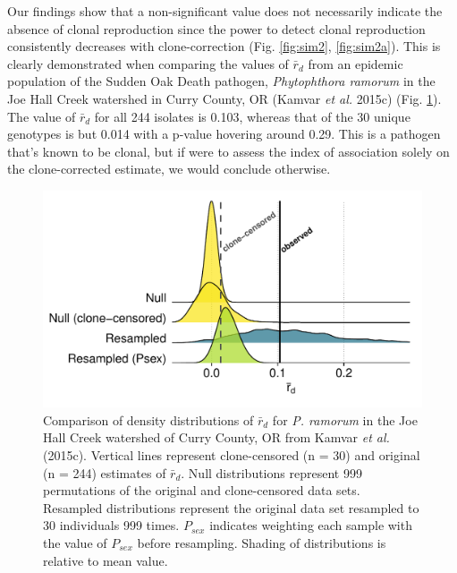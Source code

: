 \documentclass[]{article}
\theoremstyle{definition}
\theoremstyle{definition}
\theoremstyle{definition}
\theoremstyle{remark}
\begin{document}
Our findings show that a non-significant value does not necessarily
indicate the absence of clonal reproduction since the power to detect
clonal reproduction consistently decreases with clone-correction (Fig.
\ref{fig:sim2}, \ref{fig:sim2a}). This is clearly demonstrated when
comparing the values of \(\bar{r}_d\) from an epidemic population of the
Sudden Oak Death pathogen, \emph{Phytophthora ramorum} in the Joe Hall
Creek watershed in Curry County, OR (Kamvar \emph{et al.} 2015c) (Fig.
\ref{fig:pram}). The value of \(\bar{r}_d\) for all 244 isolates is
0.103, whereas that of the 30 unique genotypes is but 0.014 with a
p-value hovering around 0.29. This is a pathogen that's known to be
clonal, but if were to assess the index of association solely on the
clone-corrected estimate, we would conclude otherwise.

\begin{figure}
\centering
\includegraphics[width=1.00000\textwidth]{figure/pram.pdf}
\caption{Comparison of density distributions of \(\bar{r}_d\) for
\emph{P. ramorum} in the Joe Hall Creek watershed of Curry County, OR
from Kamvar \emph{et al.} (2015c). Vertical lines represent
clone-censored (n = 30) and original (n = 244) estimates of
\(\bar{r}_d\). Null distributions represent 999 permutations of the
original and clone-censored data sets. Resampled distributions represent
the original data set resampled to 30 individuals 999 times. \(P_{sex}\)
indicates weighting each sample with the value of \(P_{sex}\) before
resampling. Shading of distributions is relative to mean
value.}\label{fig:pram}
\end{figure}
\end{document}
